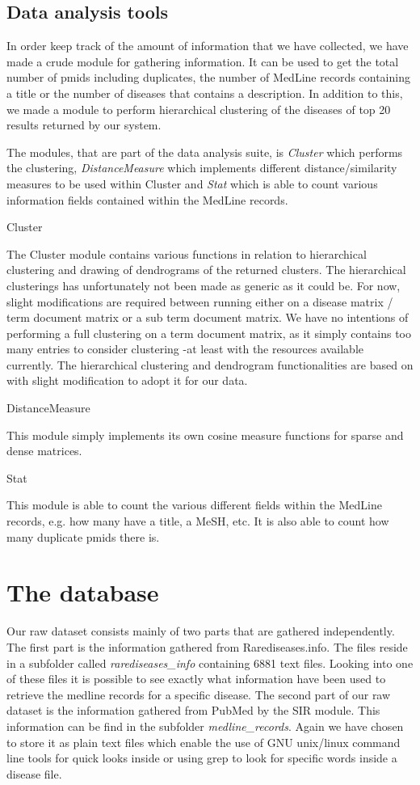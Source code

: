 \subsection{Data analysis tools}

In order keep track of the amount of information that we have
collected, we have made a crude module for gathering information. It
can be used to get the total number of pmids including duplicates, the
number of MedLine records containing a title or the number of diseases
that contains a description. In addition to this, we made a module to
perform hierarchical clustering of the diseases of top 20 results
returned by our system.

The modules, that are part of the data analysis suite, is
\textit{Cluster} which performs the clustering,
\textit{DistanceMeasure} which implements different
distance/similarity measures to be used within Cluster and
\textit{Stat} which is able to count various information fields
contained within the MedLine records.

Cluster

The Cluster module contains various functions in relation to
hierarchical clustering and drawing of dendrograms of the returned
clusters. The hierarchical clusterings has unfortunately not been made
as generic as it could be. For now, slight modifications are required
between running either on a disease matrix / term document matrix or a
sub term document matrix. We have no intentions of performing a full
clustering on a term document matrix, as it simply contains too many
entries to consider clustering -at least with the resources available
currently. The hierarchical clustering and dendrogram functionalities
are based on \cite{CollectiveIntelligence} with slight modification to
adopt it for our data.

DistanceMeasure

This module simply implements its own cosine measure functions for
sparse and dense matrices.

Stat

This module is able to count the various different fields within the
MedLine records, e.g. how many have a title, a MeSH, etc. It is also
able to count how many duplicate pmids there is.

\section{The database\label{Database}}

Our raw dataset consists mainly of two parts that are gathered
independently. The first part is the information gathered from
Rarediseases.info. The files reside in a subfolder called
\textit{rarediseases\_info} containing 6881 text files. Looking into
one of these files it is possible to see exactly what information have
been used to retrieve the medline records for a specific disease. The
second part of our raw dataset is the information gathered from PubMed
by the SIR module. This information can be find in the subfolder
\textit{medline\_records}. Again we have chosen to store it as plain
text files which enable the use of GNU unix/linux command line tools
for quick looks inside or using grep to look for specific words inside
a disease file.

